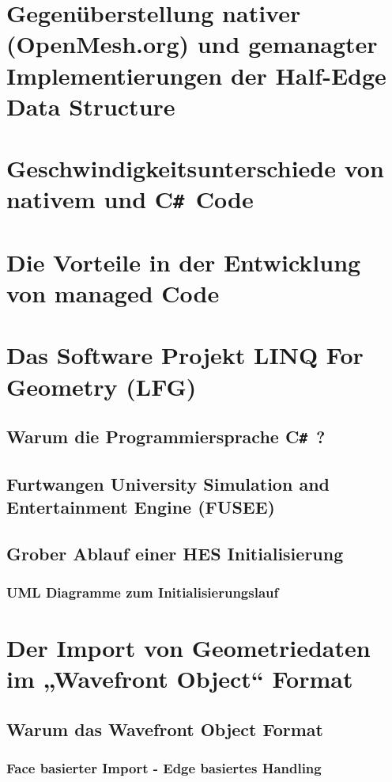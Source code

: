 \documentclass[12pt,a4paper]{scrreprt}
\newcommand{\CSS}{C\texttt{\# }}
\begin{document}
	\section {Gegenüberstellung nativer (OpenMesh.org) und gemanagter Implementierungen der Half-Edge Data Structure}
	\section {Geschwindigkeitsunterschiede von nativem und \CSS Code}
	\section {Die Vorteile in der Entwicklung von managed Code}
	\section {Das Software Projekt LINQ For Geometry (LFG)}
		\subsection {Warum die Programmiersprache \CSS ?}
		\subsection {Furtwangen University Simulation and Entertainment Engine (FUSEE)}
		\subsection {Grober Ablauf einer HES Initialisierung}
			\subsubsection {UML Diagramme zum Initialisierungslauf}
	\section {Der Import von Geometriedaten im „Wavefront Object“ Format}
		\subsection {Warum das Wavefront Object Format}
			\subsubsection {Face basierter Import - Edge basiertes Handling}
\end{document}
